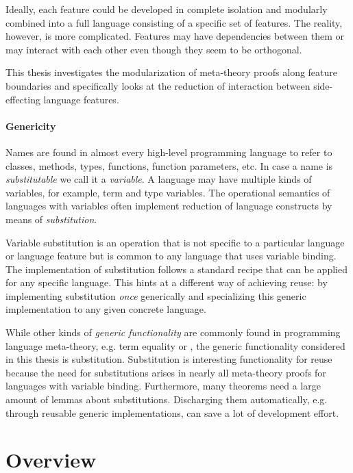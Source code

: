 {Ideally, each feature could be developed in complete isolation and modularly
combined into a full language consisting of a specific set of features. The
reality, however, is more complicated. Features may have dependencies between
them or may interact with each other even though they seem to be orthogonal.

This thesis investigates the modularization of meta-theory proofs along feature
boundaries and specifically looks at the reduction of interaction between
side-effecting language features.


\paragraph{Genericity}
Names are found in almost every high-level programming language to refer to
classes, methods, types, functions, function parameters, etc. In case a name is
\emph{substitutable} we call it a \emph{variable}. A language may have multiple
kinds of variables, for example, term and type variables. The operational
semantics of languages with variables often implement reduction of language
constructs by means of \emph{substitution}.

Variable substitution is an operation that is not specific to a particular
language or language feature but is common to any language that uses variable
binding. The implementation of substitution follows a standard recipe that can
be applied for any specific language. This hints at a different way of achieving
reuse: by implementing substitution \emph{once} generically and specializing
this generic implementation to any given concrete language.

While other kinds of \emph{generic functionality} are commonly found in
programming language meta-theory, e.g. term equality or , the generic
functionality considered in this thesis is substitution. Substitution is
interesting functionality for reuse because the need for substitutions arises in
nearly all meta-theory proofs for languages with variable binding. Furthermore,
many theorems need a large amount of lemmas about substitutions. Discharging
them automatically, e.g. through reusable generic implementations, can save a
lot of development effort.

\section{Overview}

}
